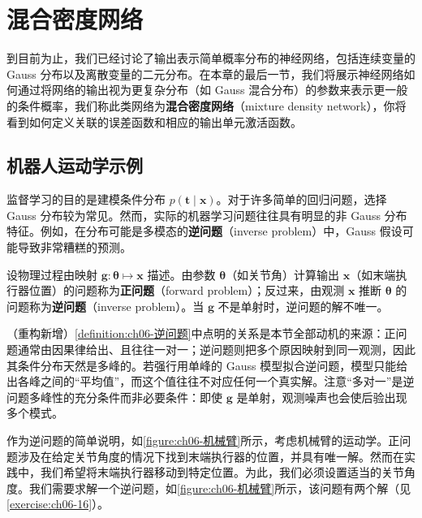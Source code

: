 \documentclass[../../main.tex]{subfiles}
\begin{document}
\section{混合密度网络}\label{section:ch06-混合密度网络}

到目前为止，我们已经讨论了输出表示简单概率分布的神经网络，包括连续变量的 Gauss 分布以及离散变量的二元分布。在本章的最后一节，我们将展示神经网络如何通过将网络的输出视为更复杂分布（如 Gauss 混合分布）的参数来表示更一般的条件概率，我们称此类网络为\textbf{混合密度网络}（mixture density network），你将看到如何定义关联的误差函数和相应的输出单元激活函数。

\subsection{机器人运动学示例}\label{subsection:ch06-机器人运动学示例}

监督学习的目的是建模条件分布 $p(\boldsymbol{t}\mid\boldsymbol{x})$。对于许多简单的回归问题，选择 Gauss 分布较为常见。然而，实际的机器学习问题往往具有明显的非 Gauss 分布特征。例如，在分布可能是多模态的\textbf{逆问题}（inverse problem）中，Gauss 假设可能导致非常糟糕的预测。

\begin{definition}[正问题与逆问题]\label{definition:ch06-逆问题}
设物理过程由映射 $\boldsymbol{g}:\boldsymbol{\theta}\mapsto\boldsymbol{x}$ 描述。由参数 $\boldsymbol{\theta}$（如关节角）计算输出 $\boldsymbol{x}$（如末端执行器位置）的问题称为\textbf{正问题}（forward problem）；反过来，由观测 $\boldsymbol{x}$ 推断 $\boldsymbol{\theta}$ 的问题称为\textbf{逆问题}（inverse problem）。当 $\boldsymbol{g}$ 不是单射时，逆问题的解不唯一。
\end{definition}

\begin{remark}（重构新增）\cref{definition:ch06-逆问题}中点明的关系是本节全部动机的来源：正问题通常由因果律给出、且往往一对一；逆问题则把多个原因映射到同一观测，因此其条件分布天然是多峰的。若强行用单峰的 Gauss 模型拟合逆问题，模型只能给出各峰之间的“平均值”，而这个值往往不对应任何一个真实解。注意“多对一”是逆问题多峰性的充分条件而非必要条件：即使 $\boldsymbol{g}$ 是单射，观测噪声也会使后验出现多个模式。
\end{remark}

作为逆问题的简单说明，如\cref{figure:ch06-机械臂}所示，考虑机械臂的运动学。正问题涉及在给定关节角度的情况下找到末端执行器的位置，并具有唯一解。然而在实践中，我们希望将末端执行器移动到特定位置。为此，我们必须设置适当的关节角度。我们需要求解一个逆问题，如\cref{figure:ch06-机械臂}所示，该问题有两个解（见\cref{exercise:ch06-16}）。
\end{document}
